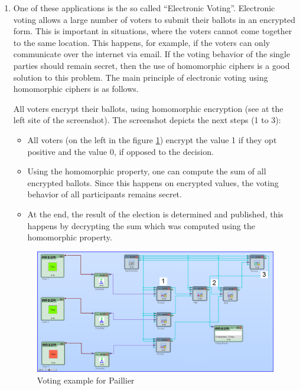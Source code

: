 \begin{bibunit}[babalpha]
\begin{enumerate}
\item One of these applications is the so called ``Electronic Voting''. Electronic voting allows a large number of voters to submit their ballots in an encrypted form. This is important in situations, where the voters cannot come together to the same location. This happens, for example, if the voters can only communicate over the internet via email. If the voting behavior of the single parties should remain secret, then the use of homomorphic ciphers is a good solution to this problem. The main principle of electronic voting using homomorphic ciphers is as follows.

All voters encrypt their ballots, using homomorphic encryption (see at the left site of the screenshot). The screenshot depicts the next steps (1 to 3):

\begin{itemize}
\item All voters (on the left in the figure \ref{CT2-PaillierVoting}) encrypt the value 1 if they opt positive and the value 0, if opposed to the decision.
\item Using the homomorphic property, one can compute the sum of all encrypted ballots. Since this happens on encrypted values, the voting behavior of all participants remains secret.
\item At the end, the result of the election is determined and published, this happens by decrypting the sum which was computed using the homomorphic property.
\end{itemize}

\begin{figure}[ht]
\begin{center}
\includegraphics[scale=0.4]{figures/CT2-PaillierVoting.png}
\caption{Voting example for Paillier} 
\label{CT2-PaillierVoting}
\end{center}
\end{figure}


\end{enumerate}
\end{bibunit}
